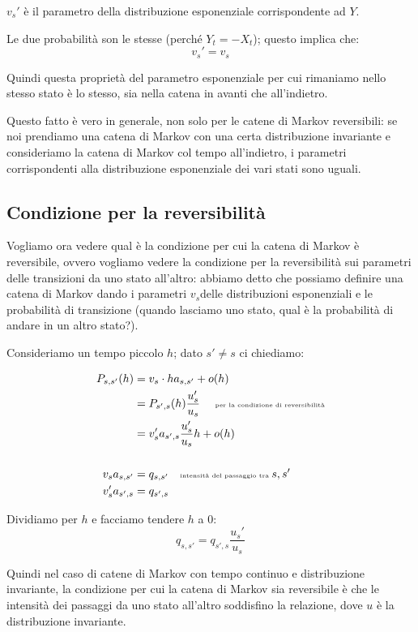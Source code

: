 \documentclass[a4paper,12pt]{book}
\begin{document}
$ v_s' $ è il parametro della distribuzione esponenziale corrispondente ad $ Y $.

Le due probabilità son le stesse (perché $ Y_t = -X_t $); questo implica che:
$$ v_s' = v_s $$

Quindi questa proprietà del parametro esponenziale per cui rimaniamo nello stesso stato è lo stesso, sia nella catena in avanti che all'indietro.

Questo fatto è vero in generale, non solo per le catene di Markov reversibili: se noi prendiamo una catena di Markov con una certa distribuzione invariante e consideriamo la catena di Markov col tempo all'indietro, i parametri corrispondenti alla distribuzione esponenziale dei vari stati sono uguali. 

\subsection{Condizione per la reversibilità}
Vogliamo ora vedere qual è la condizione per cui la catena di Markov è reversibile, ovvero vogliamo vedere la condizione per la reversibilità sui parametri delle transizioni da uno stato all'altro: abbiamo detto che possiamo definire una catena di Markov dando i parametri $ v_s $delle distribuzioni esponenziali e le probabilità di transizione (quando lasciamo uno stato, qual è la probabilità di andare in un altro stato?).

Consideriamo un tempo piccolo $ h $; dato $ s' \ne s $ ci chiediamo:

\begin{align*}
	P_{s,s'}(h) & = v_s \cdot h a_{s,s'} + o(h) \\
	& = P_{s',s}(h)\frac{u_s'}{u_s} \quad \text{ \tiny{per la condizione di reversibilità}} \\
	& = v_s' a_{s',s} \frac{u_s'}{u_s} h + o(h) \\
	\\
	v_s a_{s,s'} & = q_{s,s'} \quad \text{\tiny{intensità del passaggio tra }} \tiny{s,s'} \\
	v_s' a_{s',s} & = q_{s',s} \\
\end{align*}

Dividiamo per $ h $ e facciamo tendere $ h $ a 0:
$$ q_{s,s'} = q_{s',s} \frac{u_s'}{u_s} $$

Quindi nel caso di catene di Markov con tempo continuo e distribuzione invariante, la condizione per cui la catena di Markov sia reversibile è che le intensità dei passaggi da uno stato all'altro soddisfino la relazione, dove $ u $ è la distribuzione invariante.
\end{document}
